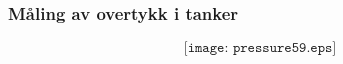 \documentclass[aspectratio=169,xcolor=dvipsnames]{beamer}
\begin{document}
%
%
%
%
%
%
%
%
%
\begin{frame}
	\frametitle{Måling av overtykk i tanker}

	$$\texttt{[image: pressure59.eps]}$$
\end{frame}
%
\end{document}
